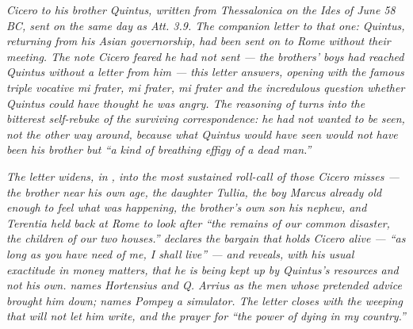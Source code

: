 
\textit{Cicero to his brother Quintus, written from Thessalonica
on the Ides of June 58 BC, sent on the same day as
\textit{Att.} 3.9. The companion letter to that one: Quintus,
returning from his Asian governorship, had been sent on to Rome
without their meeting. The note Cicero feared he had not sent ---
the brothers' boys had reached Quintus without a letter from
him --- this letter answers, opening with the famous triple
vocative \textit{mi frater, mi frater, mi frater} and the
incredulous question whether Quintus could have thought he was
angry. The reasoning of  turns into the bitterest
self-rebuke of the surviving correspondence: he had not wanted
to be seen, not the other way around, because what Quintus would
have seen would not have been his brother but ``a kind of
breathing effigy of a dead man.''}

\textit{The letter widens, in , into the most
sustained roll-call of those Cicero misses --- the brother
near his own age, the daughter Tullia, the boy Marcus already
old enough to feel what was happening, the brother's own son
his nephew, and Terentia held back at Rome to look after
``the remains of our common disaster, the children of our two
houses.''  declares the bargain that holds
Cicero alive --- ``as long as you have need of me, I shall
live'' --- and  reveals, with his usual
exactitude in money matters, that he is being kept up by
Quintus's resources and not his own.  names
Hortensius and Q. Arrius as the men whose pretended advice
brought him down;  names Pompey a
\textit{simulator}. The letter closes with the weeping that
will not let him write, and the prayer for ``the power of
dying in my country.''}
